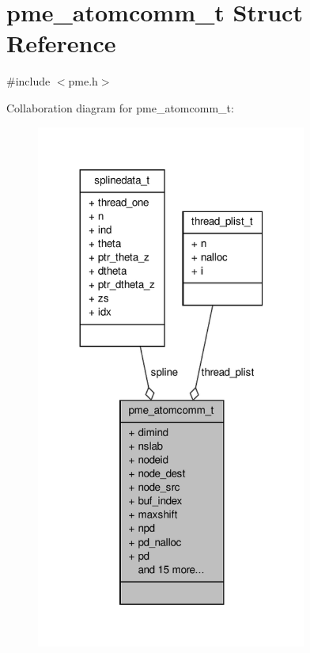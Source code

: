 \hypertarget{structpme__atomcomm__t}{\section{pme\-\_\-atomcomm\-\_\-t \-Struct \-Reference}
\label{structpme__atomcomm__t}
}


{\ttfamily \#include $<$pme.\-h$>$}



\-Collaboration diagram for pme\-\_\-atomcomm\-\_\-t\-:
\nopagebreak
\begin{figure}[H]
\begin{center}
\leavevmode
\includegraphics[width=252pt]{structpme__atomcomm__t__coll__graph}
\end{center}
\end{figure}
